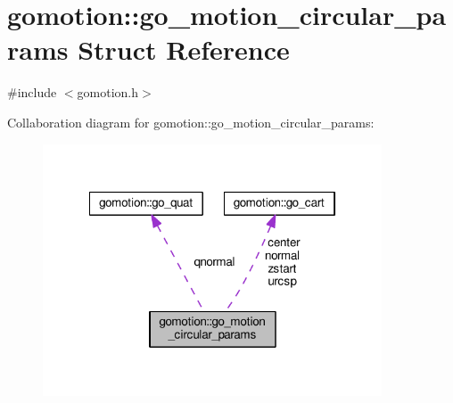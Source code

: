 \hypertarget{structgomotion_1_1go__motion__circular__params}{\section{gomotion\-:\-:go\-\_\-motion\-\_\-circular\-\_\-params Struct Reference}
\label{structgomotion_1_1go__motion__circular__params}
}


{\ttfamily \#include $<$gomotion.\-h$>$}



Collaboration diagram for gomotion\-:\-:go\-\_\-motion\-\_\-circular\-\_\-params\-:\nopagebreak
\begin{figure}[H]
\begin{center}
\leavevmode
\includegraphics[width=285pt]{da/d58/structgomotion_1_1go__motion__circular__params__coll__graph}
\end{center}
\end{figure}
